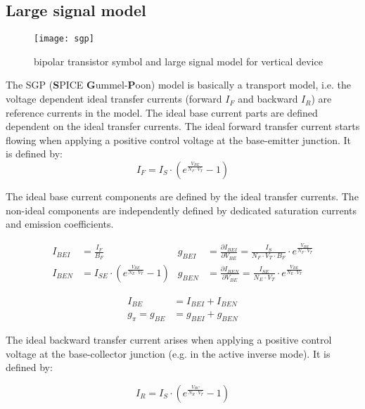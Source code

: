 \subsection{Large signal model}

\begin{figure}[ht]
\begin{center}
\texttt{[image: sgp]}
\end{center}
\caption{bipolar transistor symbol and large signal model for vertical device}
\label{fig:bjt}
\end{figure}
\FloatBarrier

The SGP (\textbf{S}PICE \textbf{G}ummel-\textbf{P}oon) model is
basically a transport model, i.e. the voltage dependent ideal transfer
currents (forward $I_F$ and backward $I_R$) are reference currents in
the model.  The ideal base current parts are defined dependent on the
ideal transfer currents.  The ideal forward transfer current starts
flowing when applying a positive control voltage at the base-emitter
junction.  It is defined by:
\begin{equation}
I_F = I_S\cdot \left(e^{\frac{V_{BE}}{N_F\cdot V_T}} -1\right)
\end{equation}

The ideal base current components are defined by the ideal transfer
currents.  The non-ideal components are independently defined by
dedicated saturation currents and emission coefficients.

\begin{align}
I_{BEI} &= \frac{I_F}{B_F} &
g_{BEI} &= \frac{\partial I_{BEI}}{\partial V_{BE}} = \frac{I_S}{N_F\cdot V_T \cdot B_F}\cdot e^{\frac{V_{BE}}{N_F\cdot V_T}}\\
I_{BEN} &= I_{SE}\cdot \left(e^{\frac{V_{BE}}{N_E\cdot V_T}} -1\right) &
g_{BEN} &= \frac{\partial I_{BEN}}{\partial V_{BE}} = \frac{I_{SE}}{N_E\cdot V_T}\cdot e^{\frac{V_{BE}}{N_E\cdot V_T}}
\end{align}

\begin{align}
I_{BE} &= I_{BEI} + I_{BEN}\\
g_{\pi} = g_{BE} &= g_{BEI} + g_{BEN}
\end{align}

The ideal backward transfer current arises when applying a positive
control voltage at the base-collector junction (e.g. in the active
inverse mode).  It is defined by:

\begin{equation}
I_R = I_S\cdot \left(e^{\frac{V_{BC}}{N_R\cdot V_T}} -1\right)
\end{equation}

